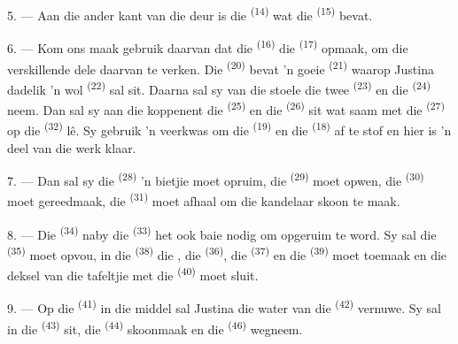 5. --- Aan die ander kant van die deur is die  \textsuperscript{(14)}
wat die  \textsuperscript{(15)} bevat.

6. --- Kom ons maak gebruik daarvan dat die 
\textsuperscript{(16)} die  \textsuperscript{(17)} opmaak, om die
verskillende dele daarvan te verken. Die  \textsuperscript{(20)} bevat
'n goeie  \textsuperscript{(21)} waarop Justina dadelik 'n wol
 \textsuperscript{(22)} sal sit. Daarna sal sy van die stoele die twee
 \textsuperscript{(23)} en die  \textsuperscript{(24)}
neem. Dan sal sy aan die koppenent die  \textsuperscript{(25)} en
die  \textsuperscript{(26)} sit wat saam met die 
\textsuperscript{(27)} op die  \textsuperscript{(32)} lê. Sy gebruik 'n
veerkwas om die  \textsuperscript{(19)} en die 
\textsuperscript{(18)} af te stof en hier is 'n deel van die werk klaar.

7. --- Dan sal sy die  \textsuperscript{(28)} 'n bietjie moet
opruim, die  \textsuperscript{(29)} moet opwen, die 
\textsuperscript{(30)} moet gereedmaak, die  \textsuperscript{(31)} moet
afhaal om die kandelaar skoon te maak.

\VUsaut{5.0mm}
\VUsaut{3.0mm}

8. --- Die  \textsuperscript{(34)} naby die 
\textsuperscript{(33)} het ook baie nodig om opgeruim te word. Sy sal die
 \textsuperscript{(35)} moet opvou, in die
 \textsuperscript{(38)} die , die
 \textsuperscript{(36)}, die  \textsuperscript{(37)} en die
 \textsuperscript{(39)} moet toemaak en die deksel van die tafeltjie met die
 \textsuperscript{(40)} moet sluit.

9. --- Op die  \textsuperscript{(41)} in die middel sal Justina
die water van die  \textsuperscript{(42)} vernuwe. Sy sal
 in die  \textsuperscript{(43)} sit, die
 \textsuperscript{(44)} skoonmaak en die 
\textsuperscript{(46)} wegneem.

